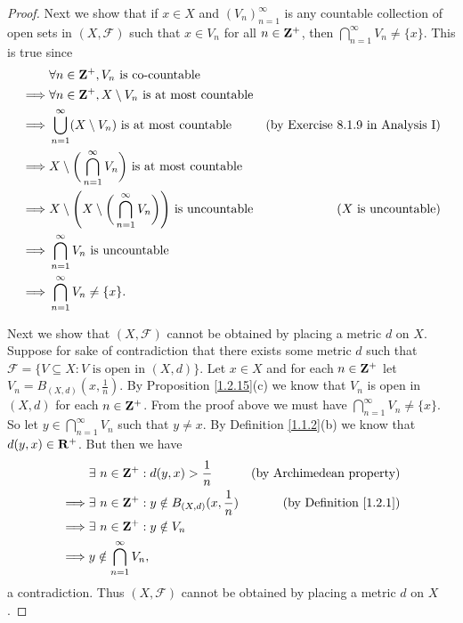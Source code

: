 \begin{proof}
    Next we show that if \(x \in X\) and \((V_n)_{n = 1}^\infty\) is any countable collection of open sets in \((X, \mathcal{F})\) such that \(x \in V_n\) for all \(n \in \mathbf{Z}^+\), then \(\bigcap_{n = 1}^\infty V_n \neq \{x\}\).
    This is true since
    \begin{align*}
                 & \forall n \in \mathbf{Z}^+, V_n \text{ is co-countable}                                                                                              \\
        \implies & \forall n \in \mathbf{Z}^+, X \setminus V_n \text{ is at most countable}                                                                             \\
        \implies & \bigcup_{n = 1}^\infty (X \setminus V_n) \text{ is at most countable}                             & \text{(by Exercise 8.1.9 in Analysis I)} \\
        \implies & X \setminus \bigg(\bigcap_{n = 1}^\infty V_n\bigg) \text{ is at most countable}                                                              \\
        \implies & X \setminus \Bigg(X \setminus \bigg(\bigcap_{n = 1}^\infty V_n\bigg)\Bigg) \text{ is uncountable} & \text{(\(X\) is uncountable)}            \\
        \implies & \bigcap_{n = 1}^\infty V_n \text{ is uncountable}                                                                                            \\
        \implies & \bigcap_{n = 1}^\infty V_n \neq \{x\}.
    \end{align*}

    Next we show that \((X, \mathcal{F})\) cannot be obtained by placing a metric \(d\) on \(X\).
    Suppose for sake of contradiction that there exists some metric \(d\) such that \(\mathcal{F} = \{V \subseteq X : V \text{ is open in } (X, d)\}\).
    Let \(x \in X\) and for each \(n \in \mathbf{Z}^+\) let \(V_n = B_{(X, d)}(x, \frac{1}{n})\).
    By Proposition \ref{1.2.15}(c) we know that \(V_n\) is open in \((X, d)\) for each \(n \in \mathbf{Z}^+\).
    From the proof above we must have \(\bigcap_{n = 1}^\infty V_n \neq \{x\}\).
    So let \(y \in \bigcap_{n = 1}^\infty V_n\) such that \(y \neq x\).
    By Definition \ref{1.1.2}(b) we know that \(d(y, x) \in \mathbf{R}^+\).
    But then we have
    \begin{align*}
                 & \exists\ n \in \mathbf{Z}^+ : d(y, x) > \frac{1}{n}               & \text{(by Archimedean property)}   \\
        \implies & \exists\ n \in \mathbf{Z}^+ : y \notin B_{(X, d)}(x, \frac{1}{n}) & \text{(by Definition \ref{1.2.1})} \\
        \implies & \exists\ n \in \mathbf{Z}^+ : y \notin V_n                                                             \\
        \implies & y \notin \bigcap_{n = 1}^\infty V_n,
    \end{align*}
    a contradiction.
    Thus \((X, \mathcal{F})\) cannot be obtained by placing a metric \(d\) on \(X\).


\end{proof}
